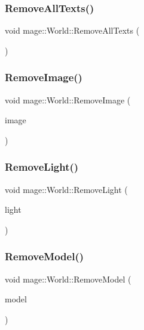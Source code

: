 \subsubsection{\texorpdfstring{Remove\+All\+Texts()}{RemoveAllTexts()}}
{\footnotesize\ttfamily void mage\+::\+World\+::\+Remove\+All\+Texts (\begin{DoxyParamCaption}{ }\end{DoxyParamCaption})}

\hypertarget{classmage_1_1_world_ada3c4f1d16e676ee1c49e630d503a8e8}{}\label{classmage_1_1_world_ada3c4f1d16e676ee1c49e630d503a8e8} 
\subsubsection{\texorpdfstring{Remove\+Image()}{RemoveImage()}}
{\footnotesize\ttfamily void mage\+::\+World\+::\+Remove\+Image (\begin{DoxyParamCaption}\item[{\hyperlink{namespacemage_a1e01ae66713838a7a67d30e44c67703e}{Shared\+Ptr}$<$ \hyperlink{classmage_1_1_sprite_image}{Sprite\+Image} $>$}]{image }\end{DoxyParamCaption})}

\hypertarget{classmage_1_1_world_ab2bca0a737500b2d78b39e6cbafd61d0}{}\label{classmage_1_1_world_ab2bca0a737500b2d78b39e6cbafd61d0} 
\subsubsection{\texorpdfstring{Remove\+Light()}{RemoveLight()}}
{\footnotesize\ttfamily void mage\+::\+World\+::\+Remove\+Light (\begin{DoxyParamCaption}\item[{\hyperlink{namespacemage_a1e01ae66713838a7a67d30e44c67703e}{Shared\+Ptr}$<$ \hyperlink{classmage_1_1_point_light}{Point\+Light} $>$}]{light }\end{DoxyParamCaption})}

\hypertarget{classmage_1_1_world_afad0c7024fcd304bb582bdc1d281c590}{}\label{classmage_1_1_world_afad0c7024fcd304bb582bdc1d281c590} 
\subsubsection{\texorpdfstring{Remove\+Model()}{RemoveModel()}}
{\footnotesize\ttfamily void mage\+::\+World\+::\+Remove\+Model (\begin{DoxyParamCaption}\item[{\hyperlink{namespacemage_a1e01ae66713838a7a67d30e44c67703e}{Shared\+Ptr}$<$ \hyperlink{classmage_1_1_model}{Model} $>$}]{model }\end{DoxyParamCaption})}

